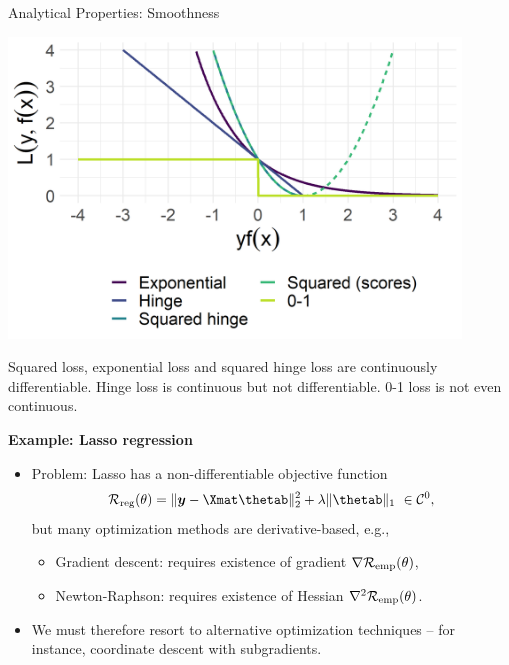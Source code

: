 \begin{vbframe}{Analytical Properties: Smoothness}
\begin{minipage}[c]{0.4\textwidth}
  \includegraphics[width=0.9\textwidth]{figure/plot_loss_overview_classif}
\end{minipage}%
\begin{minipage}[c]{0.05\textwidth}
  \phantom{foo}
\end{minipage}%
\begin{minipage}[c]{0.55\textwidth}
  \footnotesize \raggedright
  Squared loss, exponential loss and squared hinge loss are continuously 
  differentiable. Hinge loss is continuous but not differentiable. 
  0-1 loss is not even continuous.
\end{minipage}%

\framebreak

\small
\textbf{Example: Lasso regression}

\begin{itemize}
  \small
  \item Problem: Lasso has a non-differentiable 
  objective function $$\riskrt = \| \yv - \Xmat \thetab \|^2_2
  + \lambda \| \thetab \|_1 ~ \in \mathcal{C}^0,$$
  but many optimization methods are derivative-based, e.g.,
  \begin{itemize}
    \small
    \item Gradient descent: requires existence of gradient $\nabla \mathcal{R}_{\text{emp}}(\theta)$, 
    \item Newton-Raphson: requires existence of Hessian $\nabla^2 \mathcal{R}_{\text{emp}}(\theta)$.
  \end{itemize}
  \item We must therefore resort to alternative optimization 
  techniques -- for instance, coordinate descent with subgradients.
\end{itemize}

\vfill


\end{vbframe}
